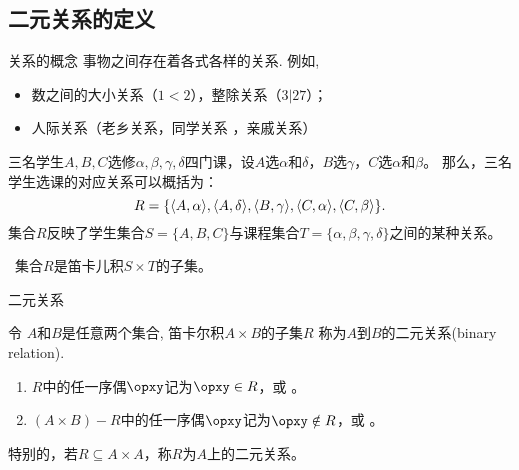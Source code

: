 \subsection{二元关系的定义}

\begin{frame}{关系的概念}
\pause
事物之间存在着各式各样的关系. \pause 例如,
\begin{itemize}
  \item 数之间的大小关系（$1<2$），整除关系（$3|27$）； \pause
  \item 人际关系（老乡关系，同学关系 ，亲戚关系）
\end{itemize}
\pause
\begin{exam}
  三名学生$A,B,C$选修$\alpha,\beta,\gamma,\delta$四门课，设$A$选$\alpha$和$\delta$，$B$选$\gamma$，$C$选$\alpha$和$\beta$。\pause
  那么，三名学生选课的对应关系可以概括为：
  \vspace{-1ex}
  $$R=\{\langle A, \alpha\rangle,\langle A, \delta\rangle,\langle B, \gamma\rangle,\langle C, \alpha\rangle,\langle C, \beta\rangle\}.\vspace{-1ex}$$ \pause
  集合$R$反映了学生集合$S=\{A,B,C\}$与课程集合$T=\{\alpha,\beta,\gamma,\delta\}$之间的某种关系。
\end{exam}
\pause
\vspace{1ex}
\finger~集合$R$是笛卡儿积$S\times T$的子集。
\end{frame}


\begin{frame}{二元关系}
\pause
\begin{defi}
  令 $A$和$B$是任意两个集合, 笛卡尔积$A\times B$的子集$R$ 称为$A$到$B$的\alert{二元关系(binary relation)}.\pause
  \begin{enumerate}
    \item $R$中的任一序偶$\opxy$记为$\opxy\in R$，或 。\pause
    \item $(A\times B)-R$中的任一序偶$\opxy$记为$\opxy\notin R$，或 。
  \end{enumerate}\pause
  特别的，若$R\subseteq A\times A$，称$R$为\alert{$A$上的二元关系}。
\end{defi}
\end{frame}


